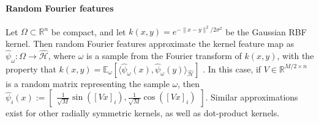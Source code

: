 \documentclass[letterpaper,12pt,peerreviewca,draftcls]{IEEEtran}
\newcommand{\s}{\sigma}
\newcommand{\R}{\mathbb{R}}
\newcommand{\E}{\mathbb{E}}
\def\l{\langle}
\def\r{\rangle}
\newcommand{\fspace}{\mathcal{H}}
\newcommand{\fmap}{\psi}
\newcommand{\kernel}{k}
\newcommand{\dom}{\Omega}
\newcommand{\ncent}{M}
\def\l{\langle}
\def\r{\rangle}
\newcommand{\fspaceApprox}{\widehat{\fspace}}
\newcommand{\fmapApprox}{\widehat{\fmap}}
\newcommand{\randFreq}{\omega}
\newcommand{\randMat}{V}
\begin{document}
 \paragraph{Random Fourier features} Let $\dom\subset\R^n$ be compact, and let $ \kernel(x,y) = e^{-\|x-y\|^2/2\s^2}$ be the Gaussian RBF kernel. Then random Fourier features approximate the kernel feature map as $\fmapApprox_{\randFreq}:\dom\to\fspaceApprox$, where $\randFreq$ is a sample from the Fourier transform of $\kernel(x,y)$, with the property that $\kernel(x,y) = \E_{\randFreq}[\l\fmapApprox_{\randFreq}(x),\fmapApprox_{\randFreq}(y)\r_{\fspaceApprox}]$ \cite{rahimi2007random}. In this case, if $\randMat\in\R^{M/2\times n}$ is a random matrix representing the sample $\randFreq$, then 
 $ 
  \fmapApprox_i(x) := \left[\begin{smallmatrix}
  \frac{1}{\sqrt{\ncent}}\sin([\randMat x]_i), \frac{1}{\sqrt{\ncent}}\cos([\randMat x]_i)
 \end{smallmatrix}\right]$. Similar approximations exist for other radially symmetric kernels, as well as dot-product kernels. 
\end{document}
